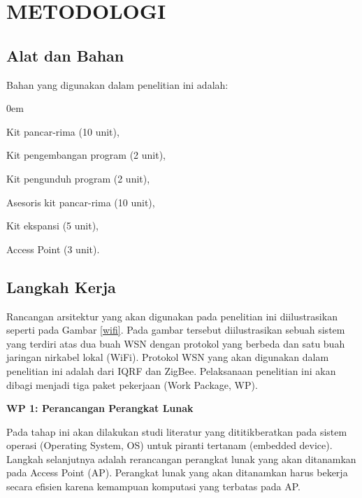 \documentclass{jtetiproposalskripsi}
\begin{document}
\chapter{METODOLOGI}

\section{Alat dan Bahan}
Bahan yang digunakan dalam penelitian ini adalah:

\vspace{-0.5cm}

\begin{enumerate}[a.]
\begin{singlespace}
\itemsep0em
\item Kit pancar-rima (10 unit),
\item Kit pengembangan program (2 unit),
\item Kit pengunduh program (2 unit),
\item Asesoris kit pancar-rima (10 unit),
\item Kit ekspansi (5 unit),
\item Access Point (3 unit).
\end{singlespace}
\end{enumerate}

\section{Langkah Kerja}
Rancangan arsitektur yang akan digunakan pada penelitian ini diilustrasikan seperti pada Gambar \ref{wifi}. Pada gambar tersebut diilustrasikan sebuah sistem yang terdiri atas dua buah WSN dengan protokol yang berbeda dan satu buah jaringan nirkabel lokal (WiFi). Protokol WSN yang akan digunakan dalam penelitian ini adalah dari IQRF dan ZigBee. Pelaksanaan penelitian ini akan dibagi menjadi tiga paket pekerjaan (Work Package, WP).

\textbf{WP 1: Perancangan Perangkat Lunak}

Pada tahap ini akan dilakukan studi literatur yang dititikberatkan pada sistem operasi (Operating System, OS) untuk piranti tertanam (embedded device). Langkah selanjutnya adalah rerancangan perangkat lunak yang akan ditanamkan pada Access Point (AP). Perangkat lunak yang akan ditanamkan harus bekerja secara efisien karena kemampuan komputasi yang terbatas pada AP.
\end{document}
